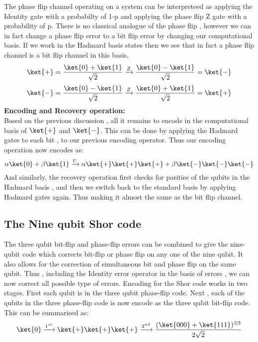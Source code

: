 The phase flip channel operating on a system can be interpreteed as applying the Identity gate with a probabilty of 1-p and applying the phase flip Z gate with a probability of p. There is no classical analogue of the phase flip , however we can in fact change a phase flip error to a bit flip error by changing our computational basis.
If we work in the Hadmard basis states then we see that in fact a phase flip channel is a bit flip channel in this basis, 
$$ \ket{+} = \frac{\ket{0}+\ket{1}}{\sqrt{2}} \xrightarrow[]{Z} \frac{\ket{0}-\ket{1}}{\sqrt{2}} = \ket{-} $$ 
$$ \ket{-} = \frac{\ket{0}-\ket{1}}{\sqrt{2}} \xrightarrow[]{Z} \frac{\ket{0}+\ket{1}}{\sqrt{2}} = \ket{+} $$ 
\textbf{Encoding and Recovery operation:}\\
Based on the previous discussion , all it remains to encode in the computational basis of $\ket{+}$ and $\ket{-}$. This can be done by applying the Hadmard gates to each bit ,  to our previous encoding operator. Thus our encoding operation now encodes as:
$$\alpha\ket{0} +\beta \ket{1} \xrightarrow[]{U} \alpha\ket{+}\ket{+}\ket{+}+ \beta\ket{-}\ket{-}\ket{-}$$
And similarly, the recovery operation first checks for parities of the qubits in the Hadmard basis , and then we switch back to the standard basis by applying Hadmard gates again. Thus making it almost the same as the bit flip channel.
\subsection{The Nine qubit Shor code}
The three qubit bit-flip and phase-flip errors can be combined to give the nine-qubit code which corrects bit-flip or phase flip on any one of the nine qubit. It also allows for the correction of simultaneous bit and phase flip on the same qubit. Thus , including the Identity error operator in the basis of errors , we can now correct all possible type of errors. Encoding for the Shor code works in two stages. First each qubit is in the three qubit phase-flip code. Next , each of the qubits in the three phase-flip code is now encode as the three qubit bit-flip code. This can be summarised as:
$$\ket{0} \xrightarrow[]{1^{st}} \ket{+}\ket{+}\ket{+} \xrightarrow[]{2^{nd}} \frac{(\ket{000}+\ket{111})^{\otimes 3}}{2\sqrt{2}}$$


